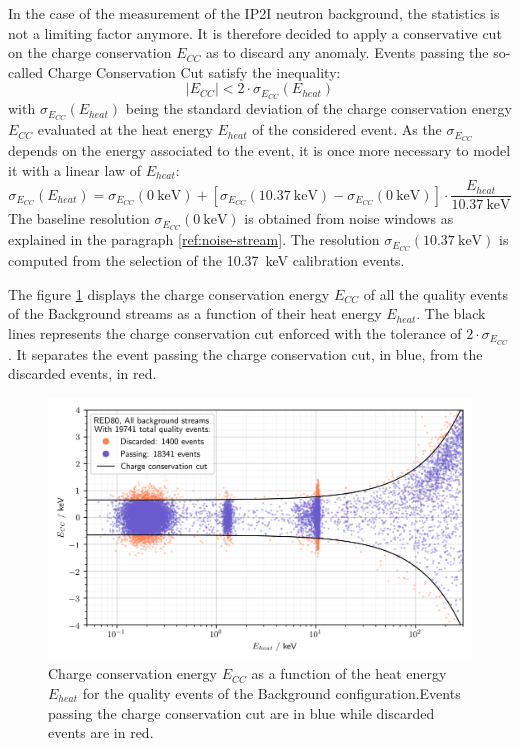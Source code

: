 In the case of the measurement of the IP2I neutron background, the statistics is not a limiting factor anymore. It is therefore decided to apply a conservative cut on the charge conservation $E_{CC}$ as to discard any anomaly. Events passing the so-called Charge Conservation Cut satisfy the inequality:
\begin{equation}
\left\vert E_{CC} \right\vert < 2 \cdot \sigma_{E_{CC}} \left( E_{heat} \right)
\end{equation}
with $\sigma_{E_{CC}} \left( E_{heat} \right)$ being the standard deviation of the charge conservation energy $E_{CC}$ evaluated at the heat energy $E_{heat}$ of the considered event.
As the $\sigma_{E_{CC}}$ depends on the energy associated to the event, it is once more necessary to model it with a linear law of $E_{heat}$:
\begin{equation}
\sigma_{E_{CC}} \left( E_{heat} \right)
=
\sigma_{E_{CC}}(\SI{0}{\kilo\eV})
+
\left[ \sigma_{E_{CC}}(\SI{10.37}{\kilo\eV}) - \sigma_{E_{CC}}(\SI{0}{\kilo\eV}) \right]
\cdot 
\frac{
E_{heat}
}{
\SI{10.37}{\kilo\eV}
}
\end{equation}
The baseline resolution $\sigma_{E_{CC}}(\SI{0}{\kilo\eV})$ is obtained from noise windows as explained in the paragraph \ref{ref:noise-stream}. The resolution $\sigma_{E_{CC}}(\SI{10.37}{\kilo\eV})$ is computed from the selection of the \SI{10.37}{\kilo\eV} calibration events.

The figure \ref{fig:charge-conservation} displays the charge conservation energy $E_{CC}$ of all the quality events of the Background streams as a function of their heat energy $E_{heat}$. The black lines represents the charge conservation cut enforced with the tolerance of $2 \cdot \sigma_{E_{CC}}$. It separates the event passing the charge conservation cut, in blue, from the discarded events, in red.

\begin{figure}
\centering
\includegraphics[scale=1]{Figures/Neutron/charge_conservation.png}
\caption{Charge conservation energy $E_{CC}$ as a function of the heat energy $E_{heat}$ for the quality events of the Background configuration.Events passing the charge conservation cut are in blue while discarded events are in red.}
\label{fig:charge-conservation}
\end{figure}

